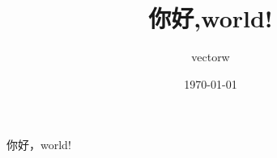 \documentclass[UTF8]{ctexart}
\title{你好,world!}
\author{vectorw}
\date{\today}
\begin{document}
\maketitle
你好，world!
\end{document}
